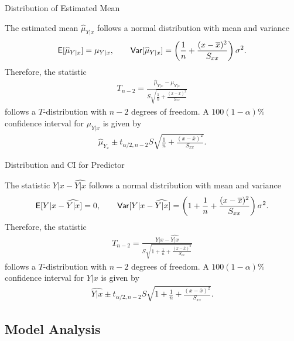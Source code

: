 \begin{frame}{Distribution of Estimated Mean}

\justifying
{} The estimated mean $\widehat{\mu}_{Y|x}$ follows a normal distribution with mean and variance
\begin{align*}
\mathsf{E}[\widehat{\mu}_{Y|x}] = \mu_{Y|x}, \qquad \mathsf{Var}[\widehat{\mu}_{Y|x}] = \left(\frac{1}{n} + \frac{(x-\overline{x})^2}{S_{xx}}\right)\sigma^2.
\end{align*}
Therefore, the statistic
\begin{align*}
T_{n-2} = \frac{\widehat{\mu}_{Y|x} - \mu_{Y|x}}{S\sqrt{\frac{1}{n}+\frac{(x-\overline{x})^2}{S_{xx}}}}
\end{align*}
follows a $T$-distribution with $n-2$ degrees of freedom. A $100(1-\alpha)\%$ confidence interval for $\mu_{Y|x}$ is given by
\begin{align*}
\widehat{\mu}_{Y_x} \pm t_{\alpha/2,n-2}S\sqrt{\frac{1}{n}+\frac{(x-\overline{x})^2}{S_{xx}}}.
\end{align*}

\end{frame}

\begin{frame}{Distribution and CI for Predictor}

\justifying
{} The statistic $Y|x - \widehat{Y|x}$ follows a normal distribution with mean and variance
\begin{align*}
\mathsf{E}[Y|x - \widehat{Y|x}] = 0, \qquad\mathsf{Var}[Y|x - \widehat{Y|x}] = \left(1 +  \frac{1}{n} + \frac{(x-\overline{x})^2}{S_{xx}} \right)\sigma^2.
\end{align*}
Therefore, the statistic
\begin{align*}
T_{n-2} = \frac{Y|x - \widehat{Y|x}}{S\sqrt{1+\frac{1}{n}+\frac{(x-\overline{x})^2}{S_{xx}}}}
\end{align*}
follows a $T$-distribution with $n-2$ degrees of freedom. A $100(1-\alpha)\%$ confidence interval for $Y|x$ is given by
\begin{align*}
\widehat{Y|x} \pm t_{\alpha/2,n-2} S\sqrt{1+\frac{1}{n}+\frac{(x-\overline{x})^2}{S_{xx}} }.
\end{align*}

\end{frame}


\subsection{Model Analysis}

